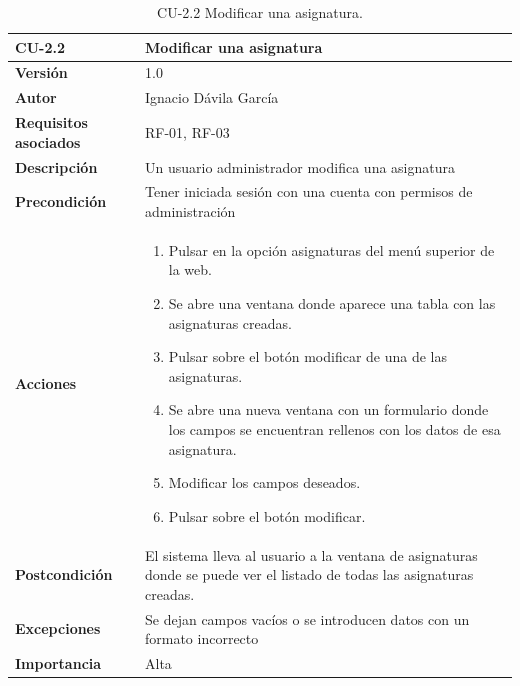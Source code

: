 \begin{table}[p]
	\centering
	\begin{tabularx}{\linewidth}{ p{} p{} }
		\toprule
		\textbf{CU-2.2}    & \textbf{Modificar una asignatura}\\
		\toprule
		\textbf{Versión}              & 1.0    \\
		\textbf{Autor}                & Ignacio Dávila García \\
		\textbf{Requisitos asociados} & RF-01, RF-03 \\
		\textbf{Descripción}          & Un usuario administrador modifica una asignatura \\
		\textbf{Precondición}         & Tener iniciada sesión con una cuenta con permisos de administración \\
		\textbf{Acciones}             &
		\begin{enumerate}
			\def\labelenumi{\arabic{enumi}.}
			\tightlist
			\item Pulsar en la opción asignaturas del menú superior de la web.
			\item Se abre una ventana donde aparece una tabla con las asignaturas creadas.
			\item Pulsar sobre el botón modificar de una de las asignaturas.
			\item Se abre una nueva ventana con un formulario donde los campos se encuentran rellenos con los datos de esa asignatura.
			\item Modificar los campos deseados.
			\item Pulsar sobre el botón modificar.
		\end{enumerate}\\
		\textbf{Postcondición}        & El sistema lleva al usuario a la ventana de asignaturas donde se puede ver el listado de todas las asignaturas creadas. \\
		\textbf{Excepciones}          & Se dejan campos vacíos o se introducen datos con un formato incorrecto \\
		\textbf{Importancia}          & Alta \\
		\bottomrule
	\end{tabularx}
	\caption{CU-2.2 Modificar una asignatura.}
\end{table}

